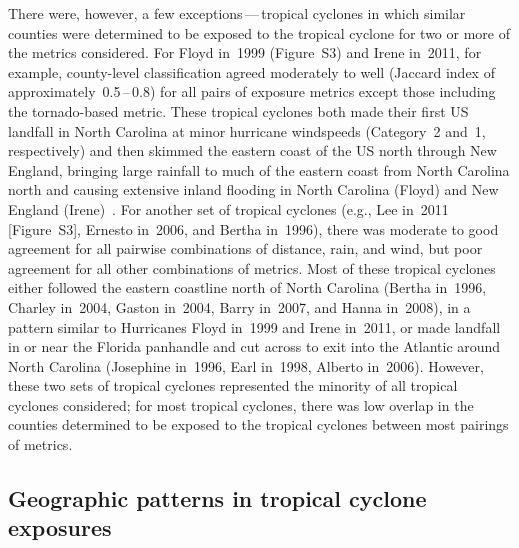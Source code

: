 There were, however, a few exceptions\,---\,tropical cyclones in which similar
counties were determined to be exposed to the tropical cyclone for two or more
of the metrics considered.  For Floyd in~1999 (Figure~S3) and Irene in~2011,
for example, county-level classification agreed moderately to well (Jaccard
index of approximately~0.5\,--\,0.8) for all pairs of exposure metrics except
those including the tornado-based metric. These tropical cyclones both made
their first \ac{US}  landfall in North Carolina at minor hurricane windspeeds
(Category~2 and~1, respectively) and then skimmed the eastern coast of the
\ac{US} north through New England, bringing large rainfall to much of the
eastern coast from North Carolina north and causing extensive inland flooding
in North Carolina (Floyd) and New England (Irene)~\citep{avila2013atlantic,
lawrence2000atlantic}. For another set of tropical cyclones (e.g., Lee in~2011
[Figure~S3], Ernesto in~2006, and Bertha in~1996), there was moderate to good
agreement for all pairwise combinations of distance, rain, and wind, but poor
agreement for all other combinations of metrics. Most of these tropical
cyclones either followed the eastern coastline north of North Carolina (Bertha
in~1996, Charley in~2004, Gaston in~2004, Barry in~2007, and Hanna in~2008), in
a pattern similar to Hurricanes Floyd in~1999 and Irene in~2011, or made
landfall in or near the Florida panhandle and cut across to exit into the
Atlantic around North Carolina (Josephine in~1996, Earl in~1998, Alberto
in~2006). However, these two sets of tropical cyclones represented the minority
of all tropical cyclones considered; for most tropical cyclones, there was low
overlap in the counties determined to be exposed to the tropical cyclones
between most pairings of metrics.

\subsection*{Geographic patterns in tropical cyclone exposures}

